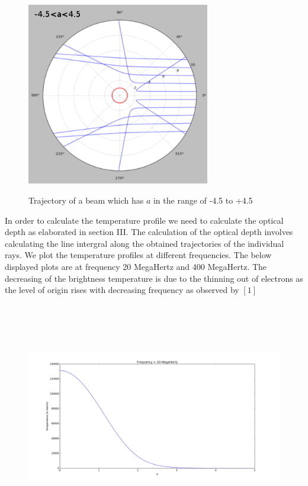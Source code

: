 \documentclass[journal]{IEEEtran}
\begin{document}
\begin{figure}[h!]
  \includegraphics[width=8cm, height=8cm]{trajectory.png}  \\  
  \caption{Trajectory of a beam which has $a$ in the range of -4.5 to +4.5}
  \label{fig:result4}  
\end{figure}
\vspace{10em}
\newpage


In order to calculate the temperature profile we need to calculate the optical depth as elaborated in section III. The calculation of the optical depth involves calculating the line intergral along the obtained trajectories of the individual rays. We plot the temperature profiles at different frequencies. The below displayed plots are at frequency 20 MegaHertz and 400 MegaHertz. The decreasing of the brightness temperature is due to the thinning out of electrons as the level of origin rises with decreasing frequency as observed by $[1]$

     

\begin{figure}[h!]
  \includegraphics[width=15cm, height=10cm]{freq=20MC.png}
  \label{fig:result2}
\end{figure}  
\end{document}
